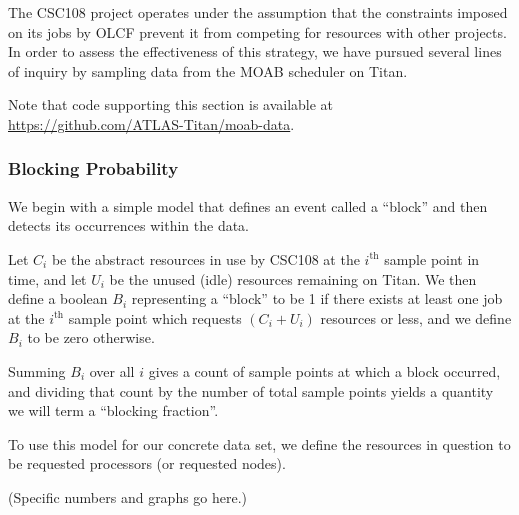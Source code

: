 The CSC108 project operates under the assumption that the constraints imposed
on its jobs by OLCF prevent it from competing for resources with other
projects. In order to assess the effectiveness of this strategy, we have
pursued several lines of inquiry by sampling data from the MOAB scheduler on
Titan.

Note that code supporting this section is available at
\url{https://github.com/ATLAS-Titan/moab-data}. 

\subsubsection{Blocking Probability}
\label{subsubsec:blockingprobability}

We begin with a simple model that defines an event called a ``block'' and then
detects its occurrences within the data.

Let $C_i$ be the abstract resources in use by CSC108 at the $i^{\text{th}}$
sample point in time, and let $U_i$ be the unused (idle) resources remaining on
Titan. We then define a boolean $B_i$ representing a ``block'' to be 1 if there
exists at least one job at the $i^{\text{th}}$ sample point which requests
$(C_i + U_i)$ resources or less, and we define $B_i$ to be zero otherwise.

Summing $B_i$ over all $i$ gives a count of sample points at which a block
occurred, and dividing that count by the number of total sample points yields a
quantity we will term a ``blocking fraction''.

To use this model for our concrete data set, we define the resources in
question to be requested processors (or requested nodes).

(Specific numbers and graphs go here.)

